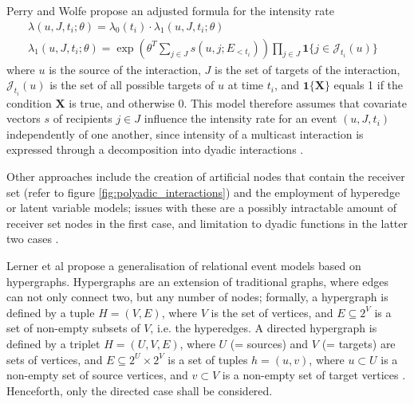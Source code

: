 Perry and Wolfe \cite{perry2013point} propose an adjusted formula for the intensity rate
\begin{align*}
	&\lambda(u,J,t_i;\theta) = \lambda_0(t_i) \cdot \lambda_1(u,J,t_i;\theta)&&\\
	&\lambda_1(u,J,t_i;\theta) = \exp(\theta^T \sum_{j\in J} s(u,j;E_{<t_i})) \prod_{j\in J} \mathbf{1}\{j \in \mathcal{J}_{t_i} (u)\}&&
\end{align*}
where $u$ is the source of the interaction, $J$ is the set of targets of the interaction, $\mathcal{J}_{t_i} (u)$ is the set of all possible targets of $u$ at time $t_i$, and $\mathbf{1}\{\mathbf{X}\}$ equals 1 if the condition $\mathbf{X}$ is true, and otherwise 0. This model therefore assumes that covariate vectors $s$ of recipients $j \in J$ influence the intensity rate for an event $(u,J,t_i)$ independently of one another, since intensity of a multicast interaction is expressed through a decomposition into dyadic interactions \cite{perry2013point,lerner2021relational}.

Other approaches include the creation of artificial nodes that contain the receiver set (refer to figure \ref{fig:polyadic_interactions}) and the employment of hyperedge or latent variable models; issues with these are a possibly intractable amount of receiver set nodes in the first case, and limitation to dyadic functions in the latter two cases \cite{lerner2021relational}. 
\bigskip

\noindent Lerner et al \cite{lerner2019rem} propose a generalisation of relational event models based on hypergraphs. Hypergraphs are an extension of traditional graphs, where edges can not only connect two, but any number of nodes; formally, a hypergraph is defined by a tuple $H = (V, E)$, where $V$ is the set of vertices, and $E \subseteq 2^V$ is a set of non-empty subsets of $V$, i.e. the hyperedges. A directed hypergraph is defined by a triplet $H = (U,V,E)$, where $U$ (= sources) and $V$ (= targets) are sets of vertices, and $E \subseteq 2^U \times 2^V$ is a set of tuples $h = (u,v)$, where $u \subset U$ is a non-empty set of source vertices, and $v \subset V$ is a non-empty set of target vertices \cite{wang2018development,lerner2019rem}. Henceforth, only the directed case shall be considered.

